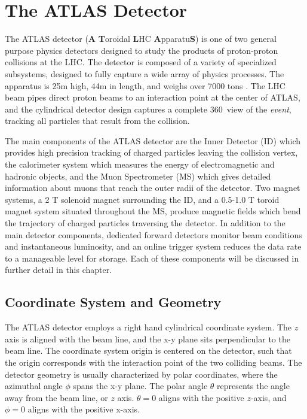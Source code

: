 \chapter{The ATLAS Detector}

\indent The ATLAS detector (\textbf{A} \textbf{T}oroidal \textbf{L}HC \textbf{A}pparatu\textbf{S}) is one of two general purpose physics detectors designed to study the products of proton-proton collisions at the LHC. The detector is composed of a variety of specialized subsystems, designed to fully capture a wide array of physics processes. The apparatus is 25m high, 44m in length, and weighs over 7000 tons \cite{atlas_overview}. The LHC beam pipes direct proton beams to an interaction point at the center of ATLAS, and the cylindrical detector design captures a complete 360\degree\ view of the \textit{event}, tracking all particles that result from the collision.\par

\indent The main components of the ATLAS detector are the Inner Detector (ID) which provides high precision tracking of charged particles leaving the collision vertex, the calorimeter system which measures the energy of electromagnetic and hadronic objects, and the Muon Spectrometer (MS) which gives detailed information about muons that reach the outer radii of the detector. Two magnet systems, a 2 T solenoid magnet surrounding the ID, and a 0.5-1.0 T toroid magnet system situated throughout the MS, produce magnetic fields which bend the trajectory of charged particles traversing the detector. In addition to the main detector components, dedicated forward detectors monitor beam conditions and instantaneous luminosity, and an online trigger system reduces the data rate to a manageable level for storage. Each of these components will be discussed in further detail in this chapter. \par

\section{Coordinate System and Geometry}

\indent The ATLAS detector employs a right hand cylindrical coordinate system. The $z$ axis is aligned with the beam line, and the x-y plane sits perpendicular to the beam line. The coordinate system origin is centered on the detector, such that the origin corresponds with the interaction point of the two colliding beams. The detector geometry is usually characterized by polar coordinates, where the azimuthal angle $\phi$ spans the x-y plane. The polar angle $\theta$ represents the angle away from the beam line, or $z$ axis. $\theta = 0$ aligns with the positive $z$-axis, and $\phi = 0$ aligns with the positive x-axis. \par

